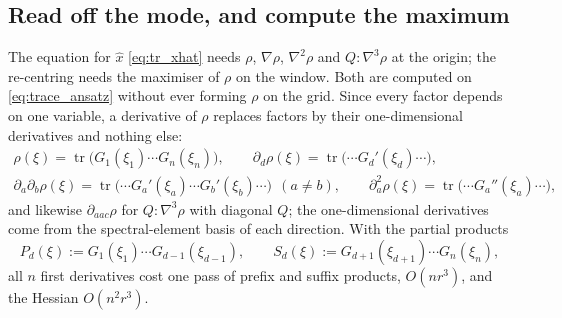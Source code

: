 \documentclass[11pt,a4paper]{article}
\newcommand{\tr}{\operatorname{tr}}
\newcommand{\xh}{\hat{x}}
\newcommand{\grad}{\nabla}
\theoremstyle{plain}
\theoremstyle{definition}
\theoremstyle{remark}
\begin{document}
\subsection{Read off the mode, and compute the maximum}
\label{sec:trace_max}

The equation for $\xh$ \eqref{eq:tr_xhat} needs $\rho$, $\grad\rho$, $\grad^2\rho$ and $Q\!:\!\grad^3\rho$ at the origin; the re-centring needs the maximiser of $\rho$ on the window. Both are computed on \eqref{eq:trace_ansatz} without ever forming $\rho$ on the grid. Since every factor depends on one variable, a derivative of $\rho$ replaces factors by their one-dimensional derivatives and nothing else:
\begin{equation}
\begin{gathered}
  \rho(\xi) = \tr\big(G_1(\xi_1)\cdots G_n(\xi_n)\big), \qquad
  \partial_d\rho(\xi) = \tr\big(\cdots G_d'(\xi_d)\cdots\big), \\
  \partial_a\partial_b\rho(\xi) = \tr\big(\cdots G_a'(\xi_a)\cdots G_b'(\xi_b)\cdots\big)\ \ (a\ne b), \qquad
  \partial_a^2\rho(\xi) = \tr\big(\cdots G_a''(\xi_a)\cdots\big),
\end{gathered}
  \label{eq:trace_derivs}
\end{equation}
and likewise $\partial_{aac}\rho$ for $Q\!:\!\grad^3\rho$ with diagonal $Q$; the one-dimensional derivatives come from the spectral-element basis of each direction. With the partial products
\begin{equation}
  P_d(\xi) := G_1(\xi_1)\cdots G_{d-1}(\xi_{d-1}), \qquad S_d(\xi) := G_{d+1}(\xi_{d+1})\cdots G_n(\xi_n),
  \label{eq:trace_partial}
\end{equation}
all $n$ first derivatives cost one pass of prefix and suffix products, $O(nr^3)$, and the Hessian $O(n^2r^3)$.
\end{document}
